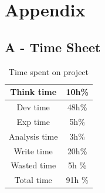 \documentclass[a4paper,10pt]{article}
\begin{document}
\newpage
\section*{Appendix}

\subsection*{A - Time Sheet}
\label{sec:appendix}


\begin{table}
\centering
\begin{tabular}{| c | c |}
\hline
 Think time  & 10h\%\\
\hline
 Dev time    & 48h\%\\
\hline
 Exp time    & 5h\%\\
\hline
 Analysis time & 3h\%\\
\hline
 Write time    & 20h\%\\
\hline
 Wasted time   & 5h \%\\
\hline
 Total time   & 91h \%\\
\hline
\end{tabular}
\caption{Time spent on project}
\end{table}



\end{document}
